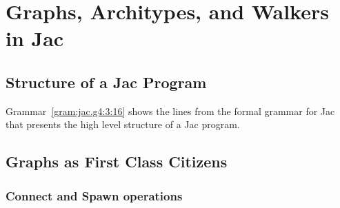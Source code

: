 \chapter{Graphs, Architypes, and Walkers in Jac}
\minitoc


\section{Structure of a Jac Program}

\par [Introduce structure of a jac program] \par
\par [Specify the differnce between graph architypes, graph instantiations, and walkers]\par
\par [Present simple program that utilizes the structures]\par
\par [Present variations on articulating the same program]\par
\par [Code blocks]\par

\begin{nerd}
    Grammar~\ref{gram:jac.g4:3:16} shows the lines from the formal grammar for Jac that presents the high level structure of a Jac program.
\end{nerd}

\section{Graphs as First Class Citizens}

\subsection{Connect and Spawn operations}

\par
{}
\par
{}


\par
{}
\par
{}

